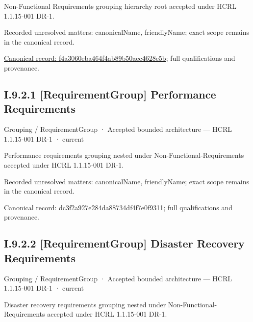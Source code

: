 Non-Functional Requirements grouping hierarchy root accepted under HCRL 1.1.15-001 DR-1.


{\small Recorded unresolved matters: canonicalName, friendlyName; exact scope remains in the canonical record.}\par
{\footnotesize \href{../../../../../../../continuum/grouping/requirement-group/f4a3060eba464f4ab89b50aec4628e5b.md}{Canonical record: f4a3060eba464f4ab89b50aec4628e5b}; full qualifications and provenance.}\par
\subsection*{I.9.2.1 [RequirementGroup] Performance Requirements}
\label{navigation:I.9.2.1}

\label{element:dc3f2a927e284da88734df4f7e0f9311}
{\small Grouping / RequirementGroup · Accepted bounded architecture — HCRL 1.1.15-001 DR-1 · current}\par

Performance requirements grouping nested under Non-Functional-Requirements accepted under HCRL 1.1.15-001 DR-1.


{\small Recorded unresolved matters: canonicalName, friendlyName; exact scope remains in the canonical record.}\par
{\footnotesize \href{../../../../../../../continuum/grouping/requirement-group/dc3f2a927e284da88734df4f7e0f9311.md}{Canonical record: dc3f2a927e284da88734df4f7e0f9311}; full qualifications and provenance.}\par
\subsection*{I.9.2.2 [RequirementGroup] Disaster Recovery Requirements}
\label{navigation:I.9.2.2}

\label{element:cb090e968a25409fb8ceb0fcc9a11ee7}
{\small Grouping / RequirementGroup · Accepted bounded architecture — HCRL 1.1.15-001 DR-1 · current}\par

Disaster recovery requirements grouping nested under Non-Functional-Requirements accepted under HCRL 1.1.15-001 DR-1.


